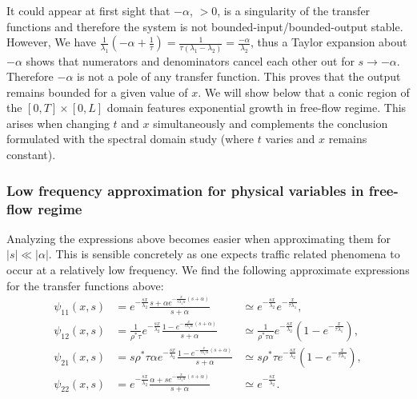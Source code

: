\documentclass[preprint]{elsarticle}
\begin{document}
It could appear at first sight that $-\alpha$, $>0$, is a singularity of the transfer functions and therefore the system is not bounded-input/bounded-output stable. However, We have $\frac{1}{\lambda_{1}}\left(-\alpha+\frac{1}{\tau}\right)=\frac{1}{\tau\left(\lambda_{1} - \lambda_{2}\right)}=\frac{-\alpha}{\lambda_{2}}$, thus a Taylor expansion about $-\alpha$ shows that numerators and denominators cancel each other out for $s \rightarrow -\alpha$. Therefore $-\alpha$ is not a pole of any transfer function. This proves that the output remains bounded for a given value of $x$. We will show below that a conic region of the $\left[0,T\right] \times \left[0,L\right]$ domain features exponential growth in free-flow regime. This arises when changing $t$ and $x$ simultaneously and complements the conclusion formulated with the spectral domain study (where $t$ varies and $x$ remains constant).

\subsubsection{Low frequency approximation for physical variables in free-flow regime}
Analyzing the expressions above becomes easier when approximating them for $\left|s\right|\ll\left|\alpha\right|$. This is sensible concretely as one expects traffic related phenomena to occur at a relatively low frequency. We find the following approximate expressions for the transfer functions above:
\begin{subequations}
\begin{align}
\psi_{11}(x,s) &=
	e^{-\frac{sx}{\lambda_{2}}}
	\frac{
	s + \alpha e^{-\frac{x}{\tau\lambda_{1}\alpha}
		\left(s + \alpha\right)	
		}
	}{
	s + \alpha
	}
&\simeq
e^{-\frac{sx}{\lambda_{2}}}
e^{-\frac{x}{\tau\lambda_{1}}}
, \\
\psi_{12}(x,s) &=
\frac{
	1
}{
	\rho^{*}\tau
}
e^{-\frac{sx}{\lambda_{2}}}
\frac{
	1 - e^{-\frac{x}{\tau\lambda_{1}\alpha}\left(s + \alpha\right)}
}{
	s + \alpha
}
&\simeq
\frac{
	1
}{
	\rho^{*}\tau\alpha
}
e^{-\frac{sx}{\lambda_{2}}}
\left(
	1 - e^{-\frac{x}{\tau\lambda_{1}}}
\right)
, \\
\psi_{21}(x,s) &=
s \rho^{*} \tau \alpha
e^{-\frac{sx}{\lambda_{2}}}
\frac{
	1 - e^{-\frac{x}{\tau\lambda_{1}\alpha}\left(s + \alpha\right)}
}{
	s + \alpha
}
& \simeq
s \rho^{*} \tau
e^{-\frac{sx}{\lambda_{2}}}
\left(
	1 - e^{-\frac{x}{\tau\lambda_{1}}}
\right)
, \\
\psi_{22}(x,s) &=
e^{-\frac{sx}{\lambda_{2}}}
\frac{
	\alpha + s e^{-\frac{x}{\tau\lambda_{1}\alpha}\left(s + \alpha\right)}
}{
	s + \alpha
}
&\simeq
e^{-\frac{sx}{\lambda_{2}}}
.
\end{align}
\end{subequations}
\end{document}
